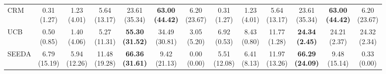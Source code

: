 {\begin{tabular}{l|cccccc|cccccc}
CRM & \makecell{0.31 \\ (1.27)} & \makecell{1.23 \\ (4.01)} & \makecell{5.64 \\ (13.17)} & {\cellcolor[HTML]{C8E6C9}} \makecell{23.61 \\ (35.34)} & \bfseries \makecell{63.00 \\ (44.42)} & \makecell{6.20 \\ (23.67)} & \makecell{0.31 \\ (1.27)} & \makecell{1.23 \\ (4.01)} & \makecell{5.64 \\ (13.17)} & {\cellcolor[HTML]{C8E6C9}} \makecell{23.61 \\ (35.34)} & \bfseries \makecell{63.00 \\ (44.42)} & \makecell{6.20 \\ (23.67)} \\
UCB & \makecell{0.50 \\ (0.85)} & \makecell{1.40 \\ (4.06)} & \makecell{5.27 \\ (11.31)} & {\cellcolor[HTML]{C8E6C9}} \bfseries \makecell{55.30 \\ (31.52)} & \makecell{34.49 \\ (30.81)} & \makecell{3.05 \\ (5.20)} & \makecell{6.92 \\ (0.53)} & \makecell{8.43 \\ (0.80)} & \makecell{11.77 \\ (1.28)} & {\cellcolor[HTML]{C8E6C9}} \bfseries \makecell{24.34 \\ (2.45)} & \makecell{24.21 \\ (2.37)} & \makecell{24.32 \\ (2.34)} \\
SEEDA & \makecell{6.79 \\ (15.19)} & \makecell{5.94 \\ (12.26)} & \makecell{11.48 \\ (19.28)} & {\cellcolor[HTML]{C8E6C9}} \bfseries \makecell{66.36 \\ (31.61)} & \makecell{9.42 \\ (21.13)} & \makecell{0.00 \\ (0.00)} & \makecell{5.51 \\ (12.08)} & \makecell{6.41 \\ (8.13)} & \makecell{11.97 \\ (13.26)} & {\cellcolor[HTML]{C8E6C9}} \bfseries \makecell{66.29 \\ (24.09)} & \makecell{9.48 \\ (15.14)} & \makecell{0.33 \\ (0.00)} \\

\end{tabular}}
